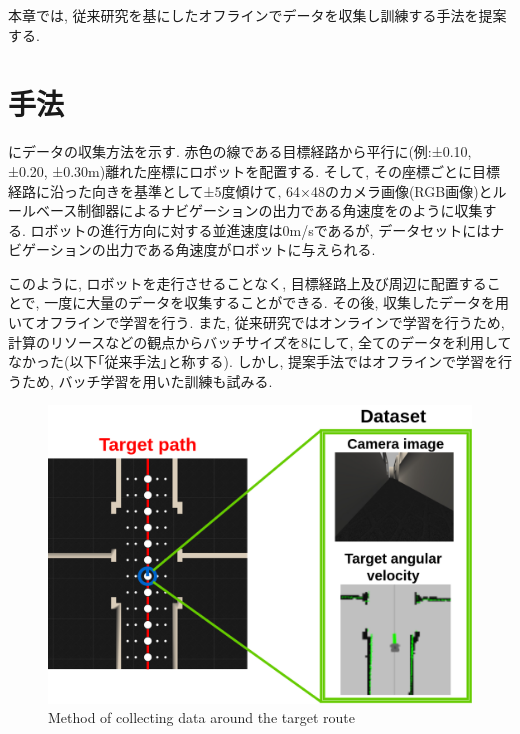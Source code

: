 
本章では, 従来研究を基にしたオフラインでデータを収集し訓練する手法を提案する.

\section{手法}

にデータの収集方法を示す. 赤色の線である目標経路から平行に(例:±0.10, ±0.20, ±0.30m)離れた座標にロボットを配置する. そして, その座標ごとに目標経路に沿った向きを基準として±5度傾けて, 64×48のカメラ画像(RGB画像)とルールベース制御器によるナビゲーションの出力である角速度をのように収集する. ロボットの進行方向に対する並進速度は0m/sであるが, データセットにはナビゲーションの出力である角速度がロボットに与えられる. \par このように, ロボットを走行させることなく, 目標経路上及び周辺に配置することで, 一度に大量のデータを収集することができる. その後, 収集したデータを用いてオフラインで学習を行う. また, 従来研究ではオンラインで学習を行うため, 計算のリソースなどの観点からバッチサイズを8にして, 全てのデータを利用してなかった(以下｢従来手法｣と称する). しかし, 提案手法ではオフラインで学習を行うため, バッチ学習を用いた訓練も試みる. 

\newpage
  \begin{figure}[h]
  \centering
  \includegraphics[keepaspectratio, scale=0.25]{images/collect-data2.png}
  \caption{Method of collecting data around the target route}
  \label{Fig:collect-data2}
  \end{figure}

